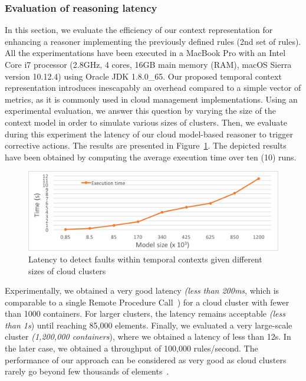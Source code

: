 \subsubsection{Evaluation of reasoning latency}
\label{sec:evaluation_latency}

In this section, we evaluate the efficiency of our context representation for enhancing a reasoner implementing the previously defined rules (2nd set of rules).
All the experimentations have been executed in a MacBook Pro with an Intel Core i7 processor (2.8GHz, 4 cores, 16GB main memory (RAM), macOS Sierra version 10.12.4) using Oracle JDK 1.8.0\_65.
Our proposed temporal context representation introduces inescapably an overhead compared to a simple vector of metrics, as it is commonly used in cloud management implementations.
Using an experimental evaluation, we answer this question by varying the size of the context model in order to simulate various sizes of clusters.
Then, we evaluate during this experiment the latency of our cloud model-based reasoner to trigger corrective actions.
The results are presented in Figure~\ref{fig:eval_latency}.
The depicted results have been obtained by computing the average execution time over ten (10) runs.

\begin{figure}
	\centering
	\includegraphics[width=\linewidth]{img/chapt-tkm/validation/latency-eval.png}
	\caption{Latency to detect faults within temporal contexts given different sizes of cloud clusters}
	\label{fig:eval_latency}
\end{figure}

Experimentally, we obtained a very good latency \textit{(less than 200ms}, which is comparable to a single Remote Procedure Call~\cite{mulligan2009comparison}) for a cloud cluster with fewer than 1000 containers. 
For larger clusters, the latency remains acceptable \textit{(less than 1s}) until reaching 85,000 elements. 
Finally, we evaluated a very large-scale cluster \textit{(1,200,000 containers}), where we obtained a latency of less than 12s.
In the later case, we obtained a throughput of 100,000 rules/second.
The performance of our approach can be considered as very good as cloud clusters rarely go beyond few thousands of elements~\cite{DBLP:conf/ccgrid/ShenBI15}.

